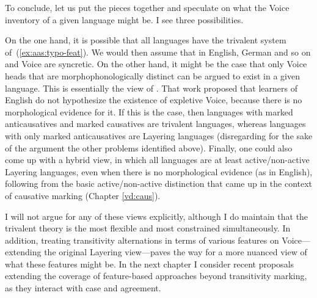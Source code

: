 To conclude, let us put the pieces together and speculate on what the Voice inventory of a given language might be. I see three possibilities.

On the one hand, it is possible that all languages have the trivalent system of~(\ref{ex:aas:typo-feat}). We would then assume that in English, German and so on {\vd} and Voice are syncretic. On the other hand, it might be the case that only Voice heads that are morphophonologically distinct can be argued to exist in a given language. This is essentially the view of \cite{layering15}. That work proposed that learners of English do not hypothesize the existence of expletive Voice, because there is no morphological evidence for it. If this is the case, then languages with marked anticausatives and marked causatives are trivalent languages, whereas languages with only marked anticausatives are Layering languages (disregarding for the sake of the argument the other problems identified above). Finally, one could also come up with a hybrid view, in which all languages are at least active/non-active Layering languages, even when there is no morphological evidence (as in English), following from the basic active/non-active distinction that came up in the context of causative marking (Chapter \ref{vd:caus}).

I will not argue for any of these views explicitly, although I do maintain that the trivalent theory is the most flexible and most constrained simultaneously. In addition, treating transitivity alternations in terms of various features on Voice---extending the original Layering view---paves the way for a more nuanced view of what these features might be. In the next chapter I consider recent proposals extending the coverage of feature-based approaches beyond transitivity marking, as they interact with case and agreement.





%
%

